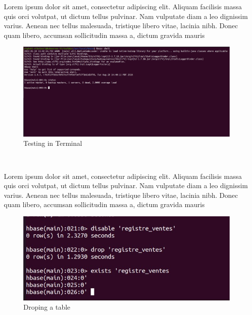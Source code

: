 \begin{spacing}{1.2}
\par Lorem ipsum dolor sit amet, consectetur adipiscing elit. Aliquam facilisis massa quis orci volutpat, ut dictum tellus pulvinar. Nam vulputate diam a leo dignissim varius. Aenean nec tellus malesuada, tristique libero vitae, lacinia nibh. Donec quam libero, accumsan sollicitudin massa a, dictum gravida mauris
\\
\begin{figure}[!htb] 
\begin{center} 
\includegraphics[width=1\linewidth]{Pictures/HBase/Configuring Hbase in Standalone & Pseudo-distributed mode/Configuring Hbase in Pseudo-distributed mode/Testing in Terminal} 
\end{center} 
\caption{Testing in Terminal} 
\end{figure}  \FloatBarrier
\\

\par Lorem ipsum dolor sit amet, consectetur adipiscing elit. Aliquam facilisis massa quis orci volutpat, ut dictum tellus pulvinar. Nam vulputate diam a leo dignissim varius. Aenean nec tellus malesuada, tristique libero vitae, lacinia nibh. Donec quam libero, accumsan sollicitudin massa a, dictum gravida mauris
\\
\begin{figure}[!htb] 
\begin{center} 
\includegraphics[width=1\linewidth]{Pictures/HBase/Configuring Hbase in Standalone & Pseudo-distributed mode/Configuring Hbase in Pseudo-distributed mode/Droping a table} 
\end{center} 
\caption{Droping a table} 
\end{figure}  \FloatBarrier
\\

\end{spacing}
